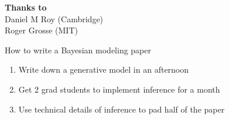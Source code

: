 

\begin{frame}
  \begin{block}{}
    \titlepage
  \end{block}
  \begin{center}
    {\bf Thanks to}\\
    Daniel M Roy (Cambridge)\\
    Roger Grosse (MIT)
  \end{center}
\end{frame}

\begin{frame}{How to write a Bayesian modeling paper}
  \begin{block}{}
    \begin{enumerate}
      \item Write down a generative model in an afternoon
      \vspace{\baselineskip}
      \vspace{\baselineskip}
      \item Get 2 grad students to implement inference for a month
      \vspace{\baselineskip}
      \vspace{\baselineskip}
      \item Use technical details of inference to pad half of the paper
    \end{enumerate}
  \end{block}
\end{frame}

